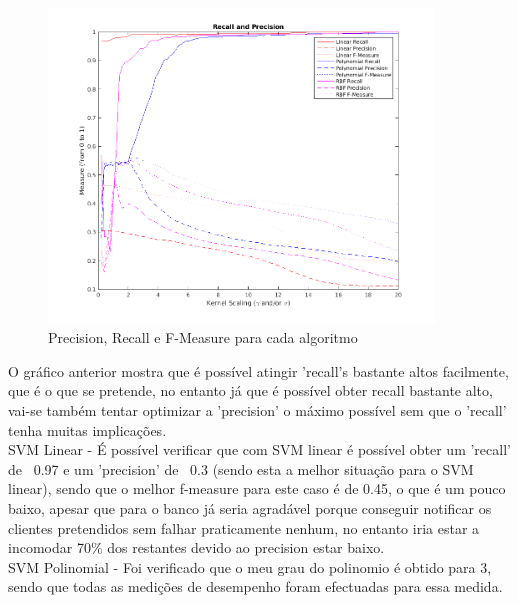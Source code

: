 \documentclass[portugues,final]{revdetua}
\begin{document}
\begin{figure}[H]
\centerline{\includegraphics[width=290pt]{images/svm_recall_precision.png}}
\caption{Precision, Recall e F-Measure para cada algoritmo}
\label{img:complete}
\end{figure}


O gráfico anterior mostra que é possível atingir 'recall's bastante altos facilmente, que é o que se pretende, no entanto já que é possível obter recall bastante alto, vai-se também tentar optimizar a 'precision' o máximo possível sem que o 'recall' tenha muitas implicações.\\

SVM Linear - É possível verificar que com SVM linear é possível obter um 'recall' de ~0.97 e um 'precision' de ~0.3 (sendo esta a melhor situação para o SVM linear), sendo que o melhor f-measure para este caso é de 0.45, o que é um pouco baixo, apesar que para o banco já seria agradável porque conseguir notificar os clientes pretendidos sem falhar praticamente nenhum, no entanto iria estar a incomodar 70\% dos restantes devido ao precision estar baixo. \\

SVM Polinomial - Foi verificado que o meu grau do polinomio é obtido para 3, sendo que todas as medições de desempenho foram efectuadas para essa medida.



\end{document}
